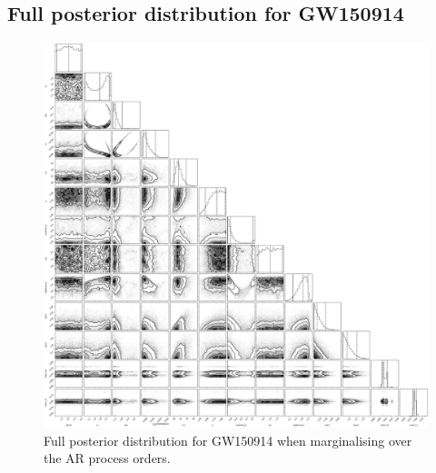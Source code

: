 \documentclass[epj,nopacs]{svjour}
\begin{document}
\begin{appendix}
\section{Full posterior distribution for GW150914} \label{sec:appendix_b}
\begin{figure}
	\caption{Full posterior distribution for GW150914 when marginalising over the AR process orders.}
	\label{fig:gw150914_full_pe}
	\includegraphics[width=\textwidth,keepaspectratio]{Images/gw150914/mega_plot.pdf}
\end{figure}
\end{appendix}
\end{document}
